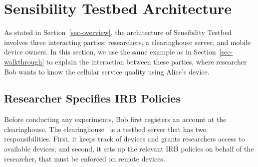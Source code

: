 \section{Sensibility Testbed Architecture}\label{sec-design}

As stated in Section~\ref{sec-overview}, the architecture of Sensibility 
Testbed involves three interacting parties:  
researchers, a clearinghouse server, and mobile device owners. In this section, we 
use the same example as in 
Section~\ref{sec-walkthrough} to explain the interaction between these 
parties, where researcher Bob wants to know the cellular service quality 
using Alice's device.


\subsection{Researcher Specifies IRB Policies}\label{sec-ch}
Before conducting any experiments, Bob first registers an account 
at the clearinghouse. 
The clearinghouse~\cite{ch} is a testbed server that has two 
responsibilities. First, it keeps track of devices and grants 
researchers access to available devices; and second, it
sets up the relevant IRB policies on behalf of the researcher, that 
must be enforced on remote devices.

